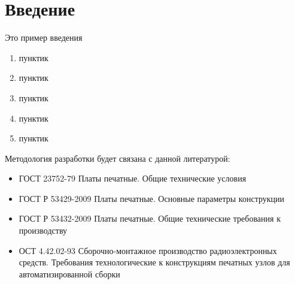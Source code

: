 \section{Введение}

Это пример введения

\begin{enumerate}
    \item пунктик
    \item пунктик
    \item пунктик
    \item пунктик
    \item пунктик
\end{enumerate}

Методология разработки будет связана с данной литературой:
\begin{itemize}
    \item ГОСТ 23752-79 Платы печатные. Общие технические условия \cite{gost23752}
    \item ГОСТ Р 53429-2009  Платы печатные. Основные параметры конструкции \cite{gost53429}
    \item ГОСТ Р 53432-2009 Платы печатные. Общие технические требования к производству \cite{gost53232}
    \item ОСТ 4.42.02-93 Сборочно-монтажное производство радиоэлектронных средств. Требования технологические к конструкциям печатных узлов для автоматизированной сборки \cite{ost44202}
\end{itemize}
